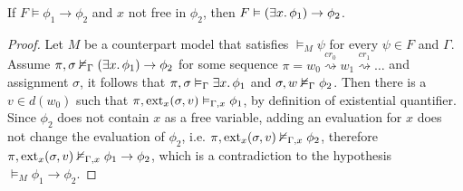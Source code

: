 \begin{lemma}\label{lem:par}
  If $F \vDash \phi_1 \to \phi_2$ and $x$ not free in $\phi_2$, then $F \vDash (\exists {x} \ldotp {\phi_1}) \to \phi_2$.
\end{lemma}
\begin{proof}
  Let $M$ be a counterpart model that satisfies $\vDash_M \psi$ for every $\psi \in F$ and $\Gamma$.
  Assume ${\pi}, {\sigma} \nvDash_{\Gamma} {(\exists {x} \ldotp {\phi_1}) \to \phi_2}$ for some sequence $\pi = w_0 \overset{cr_0}{\rightsquigarrow} w_1 \overset{cr_1}{\rightsquigarrow} \ldots$
  and assignment $\sigma$, it follows that ${\pi}, {\sigma} \vDash_{\Gamma} {\exists {x} \ldotp {\phi_1}}$ and ${\sigma}, {w} \nvDash_{\Gamma} {\phi_2}$.
  Then there is a $v \in d(w_0)$ such that ${\pi}, {\operatorname{ext}_{x}({\sigma},{v})} \vDash_{\Gamma, x} {\phi_1}$, by definition of existential
  quantifier. Since $\phi_2$ does not contain $x$ as a free variable, adding an evaluation for $x$ does not change the
  evaluation of $\phi_2$, i.e. ${\pi}, {\operatorname{ext}_{x}({\sigma},{v})} \nvDash_{\Gamma, x} {\phi_2}$, therefore
  ${\pi}, {\operatorname{ext}_{x}({\sigma},{v})} \nvDash_{\Gamma, x} {\phi_1 \to \phi_2}$, which is a contradiction to the hypothesis $\vDash_M
  \phi_1 \to \phi_2$.
\end{proof}

